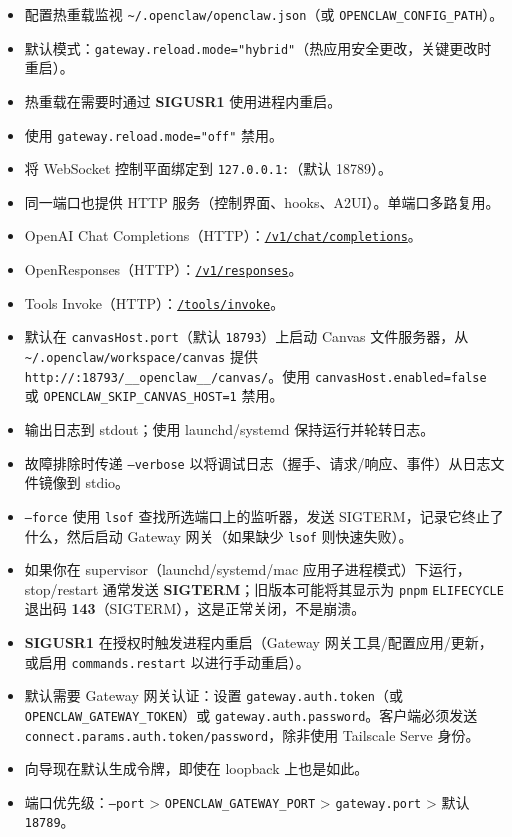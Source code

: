 \begin{itemize}
  \item 配置热重载监视 \texttt{\textasciitilde{}/.openclaw/openclaw.json}（或 \texttt{OPENCLAW\_CONFIG\_PATH}）。
  \item 默认模式：\texttt{gateway.reload.mode="hybrid"}（热应用安全更改，关键更改时重启）。
  \item 热重载在需要时通过 \textbf{SIGUSR1} 使用进程内重启。
  \item 使用 \texttt{gateway.reload.mode="off"} 禁用。
  \item 将 WebSocket 控制平面绑定到 \texttt{127.0.0.1:}（默认 18789）。
  \item 同一端口也提供 HTTP 服务（控制界面、hooks、A2UI）。单端口多路复用。
  \item OpenAI Chat Completions（HTTP）：\href{/gateway/openai-http-api}{\texttt{/v1/chat/completions}}。
  \item OpenResponses（HTTP）：\href{/gateway/openresponses-http-api}{\texttt{/v1/responses}}。
  \item Tools Invoke（HTTP）：\href{/gateway/tools-invoke-http-api}{\texttt{/tools/invoke}}。
  \item 默认在 \texttt{canvasHost.port}（默认 \texttt{18793}）上启动 Canvas 文件服务器，从 \texttt{\textasciitilde{}/.openclaw/workspace/canvas} 提供 \texttt{http://:18793/\_\_openclaw\_\_/canvas/}。使用 \texttt{canvasHost.enabled=false} 或 \texttt{OPENCLAW\_SKIP\_CANVAS\_HOST=1} 禁用。
  \item 输出日志到 stdout；使用 launchd/systemd 保持运行并轮转日志。
  \item 故障排除时传递 \texttt{--verbose} 以将调试日志（握手、请求/响应、事件）从日志文件镜像到 stdio。
  \item \texttt{--force} 使用 \texttt{lsof} 查找所选端口上的监听器，发送 SIGTERM，记录它终止了什么，然后启动 Gateway 网关（如果缺少 \texttt{lsof} 则快速失败）。
  \item 如果你在 supervisor（launchd/systemd/mac 应用子进程模式）下运行，stop/restart 通常发送 \textbf{SIGTERM}；旧版本可能将其显示为 \texttt{pnpm} \texttt{ELIFECYCLE} 退出码 \textbf{143}（SIGTERM），这是正常关闭，不是崩溃。
  \item \textbf{SIGUSR1} 在授权时触发进程内重启（Gateway 网关工具/配置应用/更新，或启用 \texttt{commands.restart} 以进行手动重启）。
  \item 默认需要 Gateway 网关认证：设置 \texttt{gateway.auth.token}（或 \texttt{OPENCLAW\_GATEWAY\_TOKEN}）或 \texttt{gateway.auth.password}。客户端必须发送 \texttt{connect.params.auth.token/password}，除非使用 Tailscale Serve 身份。
  \item 向导现在默认生成令牌，即使在 loopback 上也是如此。
  \item 端口优先级：\texttt{--port} > \texttt{OPENCLAW\_GATEWAY\_PORT} > \texttt{gateway.port} > 默认 \texttt{18789}。
\end{itemize}



